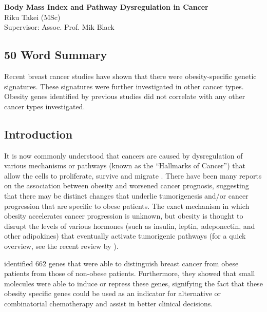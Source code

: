 \documentclass[12pt, a4paper]{article}
\begin{document}
\begin{center}
\Large{\textbf{Body Mass Index and Pathway Dysregulation in Cancer}}\\

\normalsize{
    Riku Takei (MSc)\\
        Supervisor: Assoc. Prof. Mik Black
}
\end{center}

\vspace{-30pt}

\subsection*{50 Word Summary}

Recent breast cancer studies have shown that there were obesity-specific genetic signatures.
These signatures were further investigated in other cancer types.
Obesity genes identified by previous studies did not correlate with any other cancer types investigated.


\vspace{-11pt}

\subsection*{Introduction}

It is now commonly understood that cancers are caused by dysregulation of various mechanisms or pathways (known as the ``Hallmarks of Cancer'') that allow the cells to proliferate, survive and migrate \citep{Hanahan2011}.
There have been many reports on the association between obesity and worsened cancer prognosis, suggesting that there may be distinct changes that underlie tumorigenesis and/or cancer progression that are specific to obese patients.
The exact mechanism in which obesity accelerates cancer progression is unknown, but obesity is thought to disrupt the levels of various hormones (such as insulin, leptin, adeponectin, and other adipokines) that eventually activate tumorigenic pathways (for a quick overview, see the recent review by \citet{Renehan2015}).

\citet{Creighton2012} identified 662 genes that were able to distinguish breast cancer from obese patients from those of non-obese patients.
Furthermore, they showed that small molecules were able to induce or repress these genes, signifying the fact that these obesity specific genes could be used as an indicator for alternative or combinatorial chemotherapy and assist in better clinical decisions.
\end{document}
